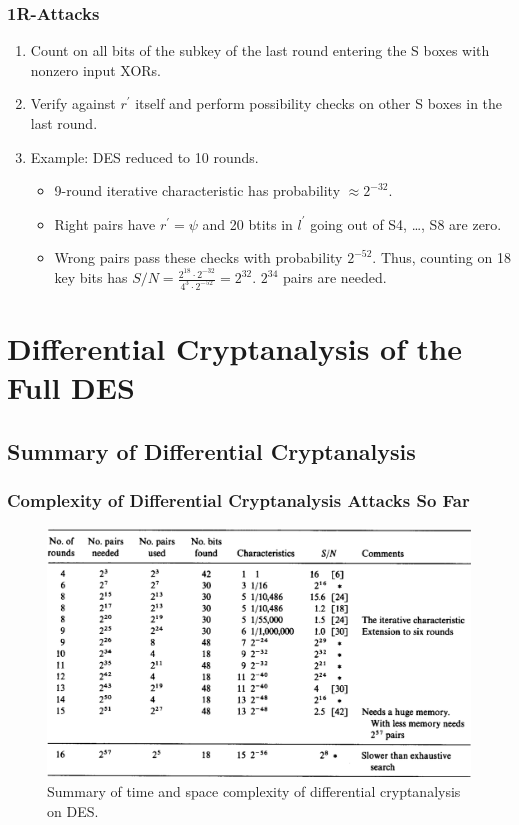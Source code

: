 \documentclass{beamer}
\begin{document}
    \begin{frame}
        \frametitle{1R-Attacks}
        \begin{enumerate}
            \item<1-> Count on all bits of the subkey of the last round entering
            the S boxes with nonzero input XORs.
            \item<2-> Verify against \(r^\prime\) itself and perform possibility
            checks on other S boxes in the last round.
            \item<3-> Example: DES reduced to 10 rounds.
            \begin{itemize}
                \item<3-> 9-round iterative characteristic has probability
                \(\approx 2^{-32}\).
                \item<4-> Right pairs have \(r^\prime = \psi\) and 20 btits in
                \(l^\prime\) going out of S4, \dots, S8 are zero.
                \item<5-> Wrong pairs pass these checks with probability
                \(2^{-52}\). Thus, counting on 18 key bits has \(S/N =
                \frac{2^{18} \cdot 2^{-32}}{4^3 \cdot 2^{-52}} = 2^32\).
                \(2^{34}\) pairs are needed.
            \end{itemize}
        \end{enumerate}
    \end{frame}

    \section[Cryptanalysis of Full DES]{Differential Cryptanalysis of the Full DES}
    \label{sec:dc-des-full}

    \subsection{Summary of Differential Cryptanalysis}
    \label{subsec:dc-summary}

    \begin{frame}
        \frametitle{Complexity of Differential Cryptanalysis Attacks So Far}
        \begin{figure}[!ht]
            \centering
            \includegraphics[width=0.7\linewidth]{images/summary.png}
            \caption{Summary of time and space complexity of differential cryptanalysis on DES.}
            \label{fig:des-summary}
        \end{figure}
    \end{frame}
\end{document}
